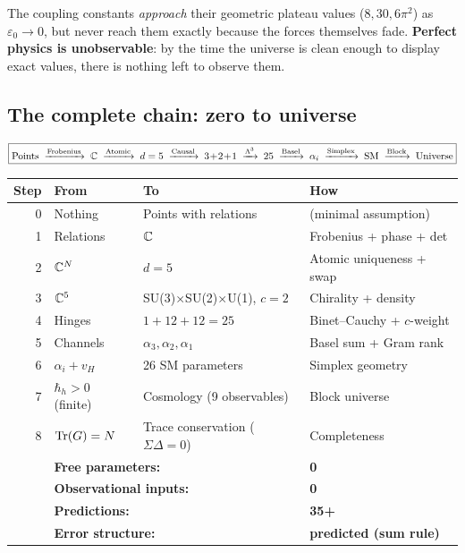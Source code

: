 The coupling constants \emph{approach} their geometric plateau values ($8, 30, 6\pi^2$) as $\varepsilon_0 \to 0$, but never reach them exactly because the forces themselves fade. \textbf{Perfect physics is unobservable}: by the time the universe is clean enough to display exact values, there is nothing left to observe them.

\subsection{The complete chain: zero to universe}

\begin{equation}
\boxed{
\text{Points} \;\xrightarrow{\text{Frobenius}}\; \mathbb{C}
\;\xrightarrow{\text{Atomic}}\; d = 5
\;\xrightarrow{\text{Causal}}\; 3\!+\!2\!+\!1
\;\xrightarrow{\Lambda^3}\; 25
\;\xrightarrow{\text{Basel}}\; \alpha_i
\;\xrightarrow{\text{Simplex}}\; \text{SM}
\;\xrightarrow{\text{Block}}\; \text{Universe}
}
\end{equation}

\begin{center}
\begin{tabular}{rlll}
\hline
Step & From & To & How \\
\hline
0 & Nothing & Points with relations & (minimal assumption) \\
1 & Relations & $\mathbb{C}$ & Frobenius + phase + det \\
2 & $\mathbb{C}^N$ & $d = 5$ & Atomic uniqueness + swap \\
3 & $\mathbb{C}^5$ & SU(3)$\times$SU(2)$\times$U(1), $c\!=\!2$ & Chirality + density \\
4 & Hinges & $1 + 12 + 12 = 25$ & Binet--Cauchy + $c$-weight \\
5 & Channels & $\alpha_3, \alpha_2, \alpha_1$ & Basel sum + Gram rank \\
6 & $\alpha_i + v_H$ & 26 SM parameters & Simplex geometry \\
7 & $\hbar_h > 0$ (finite) & Cosmology (9 observables) & Block universe \\
8 & $\operatorname{Tr}(G) = N$ & Trace conservation ($\Sigma\Delta = 0$) & Completeness \\
\hline
& \multicolumn{2}{l}{\textbf{Free parameters:}} & \textbf{0} \\
& \multicolumn{2}{l}{\textbf{Observational inputs:}} & \textbf{0} \\
& \multicolumn{2}{l}{\textbf{Predictions:}} & \textbf{35+} \\
& \multicolumn{2}{l}{\textbf{Error structure:}} & \textbf{predicted (sum rule)} \\
\hline
\end{tabular}
\end{center}

